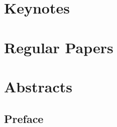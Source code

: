 \documentclass[a4paper,UKenglish]{oasicsmaster-v2016}
\begin{document}
\begin{contentslist}





\part{Keynotes}


\part{Regular Papers}


\part{Abstracts}


\end{contentslist}



\chapter{Preface} %
\end{document}
